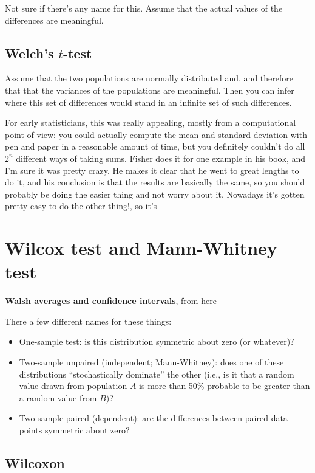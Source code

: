 Not sure if there's any name for this. Assume that the actual values of
the differences are meaningful.

\subsection{Welch's $t$-test}

Assume that the two populations are normally distributed and, and
therefore that that the variances of the populations are meaningful.
Then you can infer where this set of differences would stand in an
infinite set of such differences.

For early statisticians, this was really appealing, mostly from a
computational point of view: you could actually compute the mean and
standard deviation with pen and paper in a reasonable amount of time,
but you definitely couldn't do all \(2^n\) different ways of taking
sums. Fisher does it for one example in his book, and I'm sure it was
pretty crazy. He makes it clear that he went to great lengths to do it,
and his conclusion is that the results are basically the same, so you
should probably be doing the easier thing and not worry about it.
Nowadays it's gotten pretty easy to do the other thing!, so it's

\section{Wilcox test and Mann-Whitney
test}\label{wilcox-test-and-mann-whitney-test}

\textbf{Walsh averages and confidence intervals}, from
\href{http://www.stat.umn.edu/geyer/old03/5102/notes/rank.pdf}{here}

There a few different names for these things:

\begin{itemize}
\tightlist
\item
  One-sample test: is this distribution symmetric about zero (or
  whatever)?
\item
  Two-sample unpaired (independent; Mann-Whitney): does one of these
  distributions ``stochastically dominate'' the other (i.e., is it that
  a random value drawn from population \(A\) is more than 50\% probable
  to be greater than a random value from \(B\))?
\item
  Two-sample paired (dependent): are the differences between paired data
  points symmetric about zero?
\end{itemize}

\subsection{Wilcoxon}\label{wilcoxon}

